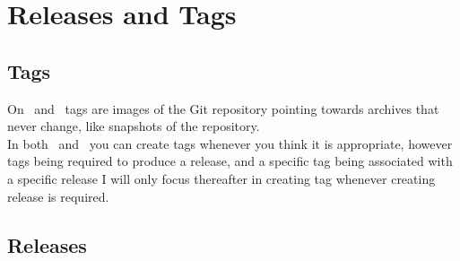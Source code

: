 \clearpage

\section{Releases and Tags}

\subsection{Tags}
\label{gtags}

On \github\ and \gitlab\ tags are images of the Git repository pointing towards archives that never change, 
like snapshots of the repository. \\
In both \github\ and \gitlab\ you can create tags whenever you think it is appropriate, 
however tags being required to produce a release, and a specific tag being associated with a specific release 
I will only focus thereafter in creating tag whenever creating release is required. 

\subsection{Releases}

